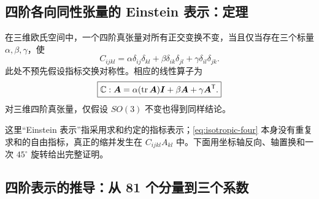 \subsection{四阶各向同性张量的 Einstein 表示：定理}

\begin{theorem}[四阶各向同性表示]\label{thm:isotropic-four}
在三维欧氏空间中，一个四阶真张量对所有正交变换不变，当且仅当存在三个标量 $\alpha,\beta,\gamma$，使
\begin{equation}
 \boxed{C_{ijkl}=\alpha\delta_{ij}\delta_{kl}
 +\beta\delta_{ik}\delta_{jl}
 +\gamma\delta_{il}\delta_{jk}.}\label{eq:isotropic-four}
\end{equation}
此处不预先假设指标交换对称性。相应的线性算子为
\begin{equation}
 \boxed{\mathbb C:\bm{A}
 =\alpha(\operatorname{tr}\bm{A})\bm{I}+\beta\bm{A}+\gamma\bm{A}^{\mathsf T}.}
 \label{eq:isotropic-four-action}
\end{equation}
对三维四阶真张量，仅假设 $SO(3)$ 不变也得到同样结论。
\end{theorem}

这里“Einstein 表示”指采用求和约定的指标表示；\eqref{eq:isotropic-four} 本身没有重复求和的自由指标，真正的缩并发生在 $C_{ijkl}A_{kl}$ 中。下面用坐标轴反向、轴置换和一次 $45^\circ$ 旋转给出完整证明。

\subsection{四阶表示的推导：从 81 个分量到三个系数}

